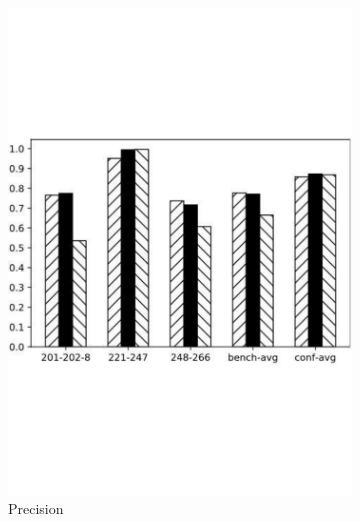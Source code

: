 \documentclass[twoside]{article}
\begin{document}
\begin{figure}[htb!]
\begin{subfigure}{0.3\textwidth}
\includegraphics[width=\textwidth]{data_figs/MulRegress_XMap_P.pdf}
\caption{Precision}
\label{fig:MultiRegress_XMap_P}
\end{subfigure}
\begin{subfigure}{0.3\textwidth}
	\centering

\end{subfigure}
\end{figure}
\end{document}
